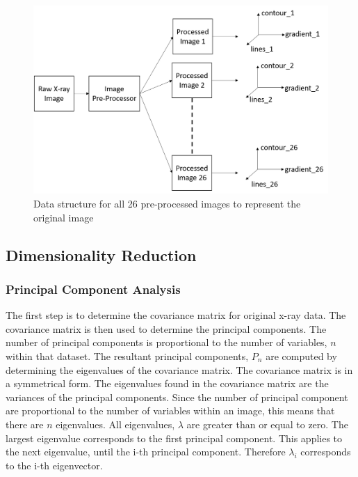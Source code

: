\documentclass[11pt,twocolumn]{witseiepaper}
\begin{document}
	\begin{figure}[!h]
		\centering
		\includegraphics[scale=0.23]{image_processing.png}
		\caption{Data structure for all 26 pre-processed images to represent the original image}
		\label{fig: data_structure}
	\end{figure}
	
	\subsection{Dimensionality Reduction}
	\subsubsection{Principal Component Analysis}
	The first step is to determine the covariance matrix for original x-ray data. The covariance matrix is then used to determine the principal components. The number of principal components is proportional to the number of variables, $n$ within that dataset. The resultant principal components, $P_n$ are computed by determining the eigenvalues of the covariance matrix. The covariance matrix is in a symmetrical form. The eigenvalues found in the covariance matrix are the variances of the principal components. Since the number of principal component are proportional to the number of variables within an image, this means that there are $n$ eigenvalues. All eigenvalues, $\lambda$ are greater than or equal to zero. The largest eigenvalue corresponds to the first principal component. This applies to the next eigenvalue, until the i-th principal component. Therefore $\lambda_i$ corresponds to the i-th eigenvector.
	
\end{document}
